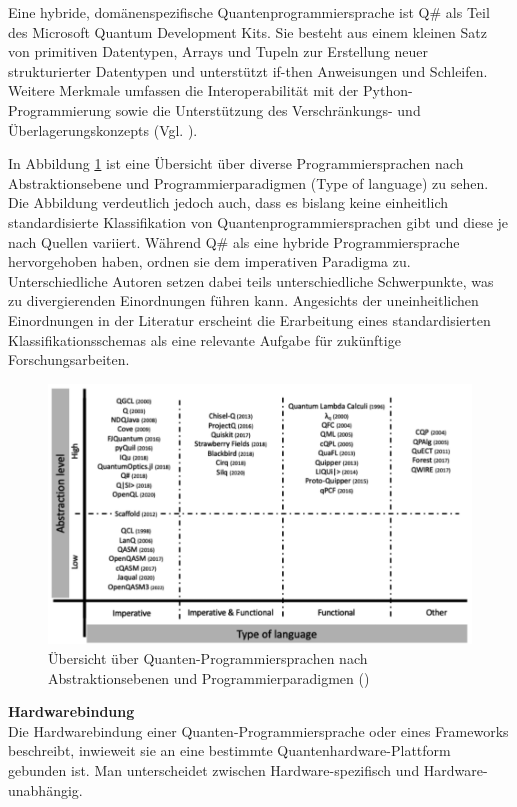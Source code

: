 Eine hybride, domänenspezifische Quantenprogrammiersprache ist Q\# als Teil des Microsoft Quantum Development Kits. Sie besteht aus einem kleinen Satz von primitiven Datentypen, Arrays und Tupeln zur Erstellung neuer strukturierter Datentypen und unterstützt if-then Anweisungen und Schleifen. Weitere Merkmale umfassen die Interoperabilität mit der Python-Programmierung sowie die Unterstützung des Verschränkungs- und Überlagerungskonzepts (Vgl. \cite{garhwal_quantum_2021}).

In Abbildung \ref{fig:quantum-landscape} ist eine Übersicht über diverse Programmiersprachen nach Abstraktionsebene und Programmierparadigmen (Type of language) zu sehen. Die Abbildung verdeutlich jedoch auch, dass es bislang keine einheitlich standardisierte Klassifikation von Quantenprogrammiersprachen gibt und diese je nach Quellen variiert. Während \citeauthor{garhwal_quantum_2021} Q\# als eine hybride Programmiersprache hervorgehoben haben, ordnen \citeauthor{serrano_quantum_2023} sie dem imperativen Paradigma zu. Unterschiedliche Autoren setzen dabei teils unterschiedliche Schwerpunkte, was zu divergierenden Einordnungen führen kann. Angesichts der uneinheitlichen Einordnungen in der Literatur erscheint die Erarbeitung eines standardisierten Klassifikationsschemas als eine relevante Aufgabe für zukünftige Forschungsarbeiten.

\begin{figure}[H]
    \centering
    \includegraphics[width=0.9\linewidth]{images/languages/Quantum-Programming-Landscape.png}
    \caption{Übersicht über Quanten-Programmiersprachen nach Abstraktionsebenen und Programmierparadigmen (\cite{serrano_quantum_2023})}
    \label{fig:quantum-landscape}
\end{figure}

\textbf{Hardwarebindung}\\
Die Hardwarebindung einer Quanten-Programmiersprache oder eines Frameworks beschreibt, inwieweit sie an eine bestimmte Quantenhardware-Plattform gebunden ist. Man unterscheidet zwischen Hardware-spezifisch und Hardware-unabhängig.

